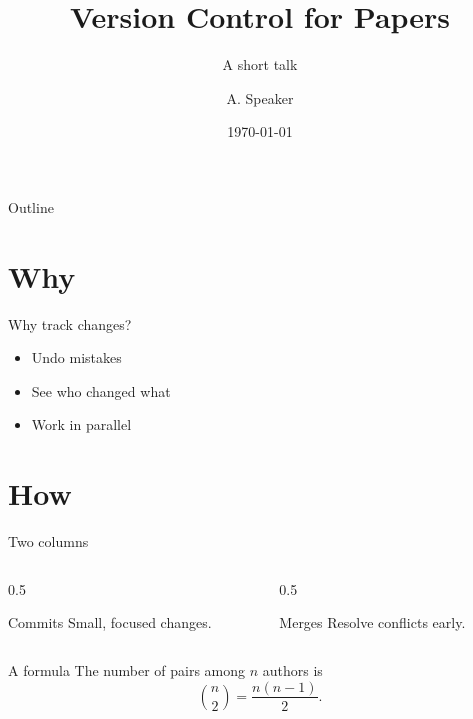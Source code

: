 \documentclass{beamer}
\title{Version Control for Papers}
\subtitle{A short talk}
\author{A. Speaker}
\institute{Example University}
\date{\today}
\begin{document}
\begin{frame}
  \titlepage
\end{frame}

\begin{frame}{Outline}
  \tableofcontents
\end{frame}

\section{Why}
\begin{frame}{Why track changes?}
  \begin{itemize}
    \item<1-> Undo mistakes
    \item<2-> See who changed what
    \item<3-> Work in parallel
  \end{itemize}
\end{frame}

\section{How}
\begin{frame}{Two columns}
  \begin{columns}
    \begin{column}{0.5\textwidth}
      \begin{block}{Commits}
        Small, focused changes.
      \end{block}
    \end{column}
    \begin{column}{0.5\textwidth}
      \begin{alertblock}{Merges}
        Resolve conflicts early.
      \end{alertblock}
    \end{column}
  \end{columns}
\end{frame}

\begin{frame}{A formula}
  \pause
  The number of pairs among $n$ authors is
  \[ \binom{n}{2} = \frac{n(n-1)}{2}. \]
\end{frame}
\end{document}

